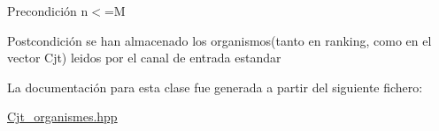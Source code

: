 \begin{DoxyPrecond}{Precondición}
n$<$=M 
\end{DoxyPrecond}
\begin{DoxyPostcond}{Postcondición}
se han almacenado los organismos(tanto en ranking, como en el vector Cjt) leidos por el canal de entrada estandar 
\end{DoxyPostcond}


La documentación para esta clase fue generada a partir del siguiente fichero\-:\begin{DoxyCompactItemize}
\item 
\hyperlink{_cjt__organismes_8hpp}{Cjt\-\_\-organismes.\-hpp}\end{DoxyCompactItemize}
